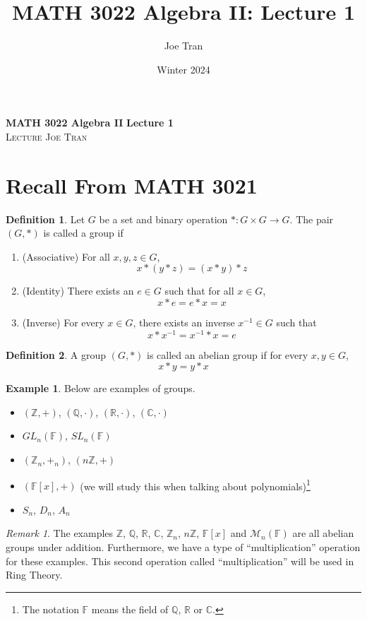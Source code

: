 \documentclass[11pt]{amsart}
\title{MATH 3022 Algebra II: Lecture 1}
\author{Joe Tran}
\date{Winter 2024}
\theoremstyle{definition}\newtheorem{definition}{Definition}
\theoremstyle{definition}\newtheorem{example}{Example}
\theoremstyle{theorem}\newtheorem{theorem}{Theorem}
\theoremstyle{theorem}\newtheorem{corollary}{Corollary}
\theoremstyle{theorem}\newtheorem{proposition}{Proposition}
\theoremstyle{theorem}\newtheorem{lemma}{Lemma}
\theoremstyle{theorem}\newtheorem{question}{Question}
\theoremstyle{remark}\newtheorem{remark}{Remark}
\newcommand{\C}{\mathbb{C}}
\newcommand{\R}{\mathbb{R}}
\newcommand{\Q}{\mathbb{Q}}
\newcommand{\Z}{\mathbb{Z}}
\newcommand{\F}{\mathbb{F}}
\newcommand{\M}{\mathcal{M}}
\begin{document}
\textbf{MATH 3022 Algebra II} \hfill \textbf{Lecture 1} \\
\textsc{Lecture} \hfill \textsc{Joe Tran}

\section{Recall From MATH 3021}

\begin{definition}\label{definition:1}
    Let $G$ be a set and binary operation $* : G \times G \to G$. The pair $(G, *)$ is called a group if
    \begin{enumerate}
        \item (Associative) For all $x, y, z \in G$, $$x * (y * z) = (x * y) * z$$
        \item (Identity) There exists an $e \in G$ such that for all $x \in G$, $$x * e = e * x = x$$
        \item (Inverse) For every $x \in G$, there exists an inverse $x^{-1} \in G$ such that $$x * x^{-1} = x^{-1} * x = e$$
    \end{enumerate}
\end{definition}

\begin{definition}\label{definition:2}
    A group $(G, *)$ is called an abelian group if for every $x, y \in G$, $$x * y = y * x$$
\end{definition}

\begin{example}\label{example:1}
    Below are examples of groups.
    \begin{itemize}
        \item $(\Z, +)$, $(\Q, \cdot)$, $(\R, \cdot)$, $(\C, \cdot)$
        \item $GL_n(\F)$, $SL_n(\F)$
        \item $(\Z_n, +_n)$, $(n\Z, +)$
        \item $(\F[x], +)$ (we will study this when talking about polynomials)\footnote{The notation $\F$ means the field of $\Q$, $\R$ or $\C$.}
        \item $S_n$, $D_n$, $A_n$
    \end{itemize}
\end{example}

\begin{remark}\label{remark:1}
    The examples $\Z$, $\Q$, $\R$, $\C$, $\Z_n$, $n\Z$, $\F[x]$ and $\M_n(\F)$ are all abelian groups under addition. Furthermore, we have a type of ``multiplication'' operation for these examples. This second operation called ``multiplication'' will be used in Ring Theory.
\end{remark}
\end{document}
